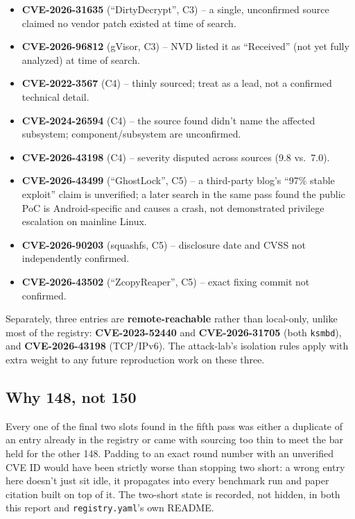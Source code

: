\documentclass[11pt,a4paper]{article}
\begin{document}
\begin{itemize}
\item \textbf{CVE-2026-31635} (``DirtyDecrypt'', C3) -- a single,
  unconfirmed source claimed no vendor patch existed at time of search.
\item \textbf{CVE-2026-96812} (gVisor, C3) -- NVD listed it as
  ``Received'' (not yet fully analyzed) at time of search.
\item \textbf{CVE-2022-3567} (C4) -- thinly sourced; treat as a lead, not
  a confirmed technical detail.
\item \textbf{CVE-2024-26594} (C4) -- the source found didn't name the
  affected subsystem; component/subsystem are unconfirmed.
\item \textbf{CVE-2026-43198} (C4) -- severity disputed across sources
  (9.8 vs.\ 7.0).
\item \textbf{CVE-2026-43499} (``GhostLock'', C5) -- a third-party
  blog's ``97\% stable exploit'' claim is unverified; a later search in
  the same pass found the public PoC is Android-specific and causes a
  crash, not demonstrated privilege escalation on mainline Linux.
\item \textbf{CVE-2026-90203} (squashfs, C5) -- disclosure date and CVSS
  not independently confirmed.
\item \textbf{CVE-2026-43502} (``ZcopyReaper'', C5) -- exact fixing
  commit not confirmed.
\end{itemize}

\noindent Separately, three entries are \textbf{remote-reachable} rather
than local-only, unlike most of the registry: \textbf{CVE-2023-52440} and
\textbf{CVE-2026-31705} (both \texttt{ksmbd}), and \textbf{CVE-2026-43198}
(TCP/IPv6). The attack-lab's isolation rules apply with extra weight to
any future reproduction work on these three.

\subsection*{Why 148, not 150}
Every one of the final two slots found in the fifth pass was either a
duplicate of an entry already in the registry or came with sourcing too
thin to meet the bar held for the other 148. Padding to an exact round
number with an unverified CVE ID would have been strictly worse than
stopping two short: a wrong entry here doesn't just sit idle, it
propagates into every benchmark run and paper citation built on top of
it. The two-short state is recorded, not hidden, in both this report and
\texttt{registry.yaml}'s own README.
\end{document}
